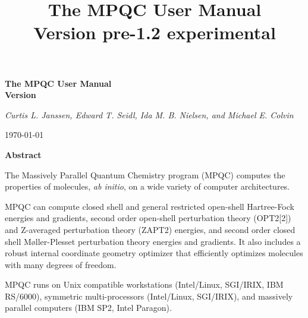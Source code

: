 \documentclass[notitlepage,letterpaper%
              ]{report}
\begin{document}
\begin{htmlonly}
\title{The MPQC User Manual \\
       Version pre-1.2 experimental}
\end{htmlonly}
%



\begin{titlepage}

\begin{center}
\LARGE\bfseries The MPQC User Manual \\
Version 
\end{center}

\begin{center}
{\large\itshape Curtis L. Janssen, Edward T. Seidl, Ida M. B. Nielsen, and
Michael E. Colvin}
\end{center}

\begin{center}
\today
\end{center}

\vfill

\begin{center}
\textbf{Abstract}
\end{center}

The Massively Parallel Quantum Chemistry program (MPQC) computes
the properties of molecules, {\it ab initio}, on a wide variety
of computer architectures.

MPQC can compute closed shell and general restricted open-shell
Hartree-Fock energies and gradients, second order open-shell
perturbation theory (OPT2[2]) and Z-averaged perturbation theory
(ZAPT2) energies, and second order closed shell M\o{}ller-Plesset
perturbation theory energies and gradients.  It also includes a
robust internal coordinate geometry optimizer that efficiently
optimizes molecules with many degrees of freedom.

MPQC runs on Unix compatible workstations (Intel/Linux, SGI/IRIX,
IBM RS/6000), symmetric multi-processors (Intel/Linux, SGI/IRIX), and
massively parallel computers (IBM SP2, Intel Paragon).



\end{titlepage}
\end{document}
